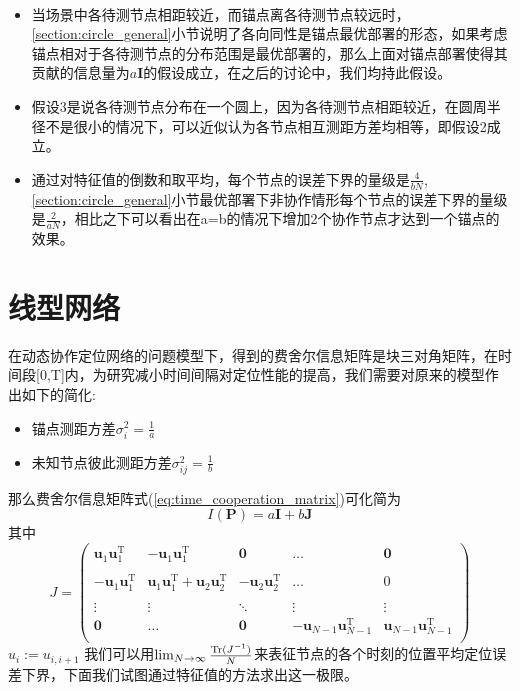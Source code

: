 \begin{remark}
~\\
\begin{itemize}
  \item 当场景中各待测节点相距较近，而锚点离各待测节点较远时，\ref{section:circle_general}小节说明了各向同性是锚点最优部署的形态，如果考虑锚点相对于各待测节点的分布范围是最优部署的，那么上面对锚点部署使得其贡献的信息量为$a\bm{I}$的假设成立，在之后的讨论中，我们均持此假设。
  \item 假设3是说各待测节点分布在一个圆上，因为各待测节点相距较近，在圆周半径不是很小的情况下，可以近似认为各节点相互测距方差均相等，即假设2成立。
  \item 通过对特征值的倒数和取平均，每个节点的误差下界的量级是$\frac{4}{bN}$,\ref{section:circle_general}小节最优部署下非协作情形每个节点的误差下界的量级是$\frac{2}{aN}$，相比之下可以看出在a=b的情况下增加2个协作节点才达到一个锚点的效果。
\end{itemize}

\end{remark}
\section{线型网络}\label{section:linear_network}
在动态协作定位网络的问题模型下，得到的费舍尔信息矩阵是块三对角矩阵，在时间段[0,T]内，为研究减小时间间隔对定位性能的提高，我们需要对原来的模型作出如下的简化:
\begin{itemize}
\item 锚点测距方差$\sigma_i^2=\frac{1}{a}$
\item 未知节点彼此测距方差$\sigma^2_{ij}=\frac{1}{b}$
\end{itemize}
那么费舍尔信息矩阵式(\ref{eq:time_cooperation_matrix})可化简为
\begin{equation}\label{eq:Pab}
I(\bm{P})=a\bm{I}+b\bm{J}
\end{equation}
其中\[
J=\left(
\begin{array}{ccccc}
\bm{u}_{1}\bm{u}_{1}^{\textrm{T}} &-\bm{u}_{1}\bm{u}_{1}^{\textrm{T}} &\bm{0}&\dots&\bm{0}\\
&&&&\\
-\bm{u}_{1}\bm{u}_{1}^{\textrm{T}} &\bm{u}_{1}\bm{u}_{1}^{\textrm{T}} +\bm{u}_{2}\bm{u}_{2}^{\textrm{T}} &-\bm{u}_{2}\bm{u}_{2}^{\textrm{T}} &\dots&0\\
&&&&\\
\vdots &\vdots&\ddots &\vdots&\vdots\\
\bm{0}&\dots&\bm{0}&-\bm{u}_{N-1}\bm{u}_{N-1}^{\textrm{T}} &\bm{u}_{N-1}\bm{u}_{N-1}^{\textrm{T}} \\
\end{array}
\right)
\]
$u_i:=u_{i,i+1}$
我们可以用$\lim_{N\to \infty}\frac{\operatorname{Tr}(J^{-1})}{N}$来表征节点的各个时刻的位置平均定位误差下界，下面我们试图通过特征值的方法求出这一极限。


